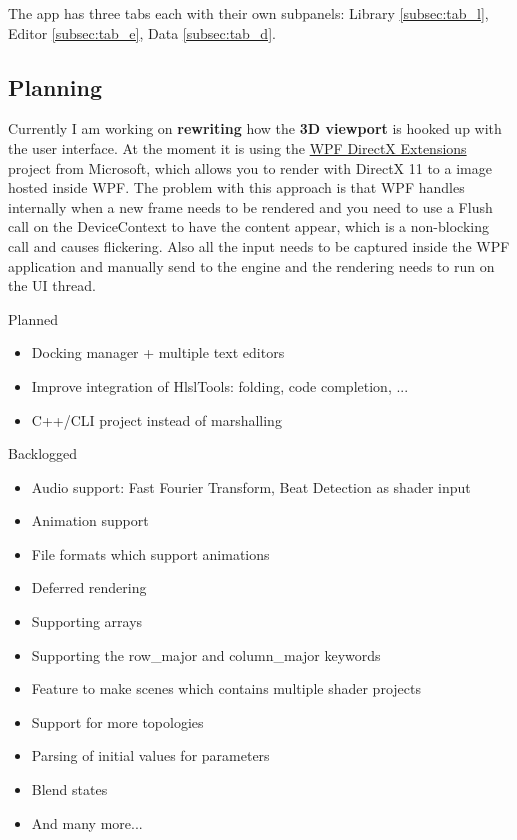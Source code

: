\documentclass{paper}
\newcommand*\bracket[1]{\lbrack#1\rbrack} %
\begin{document}
\par
The app has three tabs each with their own subpanels: Library \bracket{\ref{subsec:tab_l}}, Editor \bracket{\ref{subsec:tab_e}}, Data \bracket{\ref{subsec:tab_d}}.

\newpage
\subsection{Planning}
Currently I am working on \textbf{rewriting} how the \textbf{3D viewport} is hooked up with the user interface. At the moment it is using the \href{https://github.com/Microsoft/WPFDXInterop}{WPF DirectX Extensions} project from Microsoft, which allows you to render with DirectX 11 to a image hosted inside WPF. The problem with this approach is that WPF handles internally when a new frame needs to be rendered and you need to use a Flush call on the DeviceContext to have the content appear, which is a non-blocking call and causes flickering. Also all the input needs to be captured inside the WPF application and manually send to the engine and the rendering needs to run on the UI thread.
\par
Planned
\begin{itemize}[noitemsep]
	\item Docking manager + multiple text editors
	\item Improve integration of HlslTools: folding, code completion, ...
	\item C++/CLI project instead of marshalling
\end{itemize}

Backlogged
\begin{itemize}[noitemsep]
\item Audio support: Fast Fourier Transform, Beat Detection as shader input
\item Animation support
\item File formats which support animations
\item Deferred rendering
\item Supporting arrays
\item Supporting the row\_major and column\_major keywords
\item Feature to make scenes which contains multiple shader projects
\item Support for more topologies
\item Parsing of initial values for parameters
\item Blend states
\item And many more...
\end{itemize}
\end{document}
